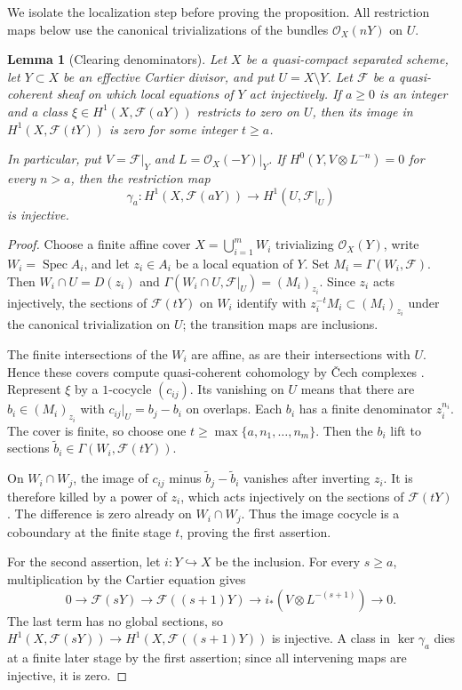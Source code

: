 \documentclass[11pt,reqno]{amsart}
\numberwithin{equation}{section}
\newtheorem{lemma}[theorem]{Lemma}
\theoremstyle{definition}
\theoremstyle{remark}
\newcommand{\OO}{\mathcal O}
\newcommand{\FF}{\mathcal F}
\newcommand{\Spec}{\operatorname{Spec}}
\begin{document}
We isolate the localization step before proving the proposition.
All restriction maps below use the canonical trivializations of the
bundles $\OO_X(nY)$ on $U$.

\begin{lemma}[Clearing denominators]\label{lem:clearing-denominators}
Let $X$ be a quasi-compact separated scheme, let $Y\subset X$ be an
effective Cartier divisor, and put $U=X\setminus Y$. Let $\FF$ be a
quasi-coherent sheaf on which local equations of $Y$ act injectively.
If $a\geq0$ is an integer and a class $\xi\in H^1(X,\FF(aY))$ restricts to zero
on $U$, then its image in $H^1(X,\FF(tY))$ is zero for some
integer $t\geq a$.

In particular, put $V=\FF|_Y$ and $L=\OO_X(-Y)|_Y$. If
$H^0(Y,V\otimes L^{-n})=0$ for every $n>a$, then the restriction map
\[
 \gamma_a:H^1(X,\FF(aY))\longrightarrow H^1(U,\FF|_U)
\]
is injective.
\end{lemma}

\begin{proof}
Choose a finite affine cover $X=\bigcup_{i=1}^m W_i$ trivializing
$\OO_X(Y)$, write $W_i=\Spec A_i$, and let $z_i\in A_i$ be a local
equation of $Y$. Set $M_i=\Gamma(W_i,\FF)$. Then
$W_i\cap U=D(z_i)$ and
$\Gamma(W_i\cap U,\FF|_U)=(M_i)_{z_i}$.
Since $z_i$ acts injectively, the sections of $\FF(tY)$ on $W_i$
identify with $z_i^{-t}M_i\subset(M_i)_{z_i}$ under the canonical
trivialization on $U$; the transition maps are inclusions.

The finite intersections of the $W_i$ are affine, as are their
intersections with $U$. Hence these covers compute quasi-coherent
cohomology by \v{C}ech complexes
\cite[Tags 0BDX and 01XD]{Stacks}.
Represent $\xi$ by a $1$-cocycle $(c_{ij})$. Its vanishing on $U$
means that there are $b_i\in(M_i)_{z_i}$ with
$c_{ij}|_U=b_j-b_i$ on overlaps. Each $b_i$ has a finite denominator
$z_i^{n_i}$. The cover is finite, so choose one
$t\geq\max\{a,n_1,\ldots,n_m\}$. Then the $b_i$ lift to sections
$\widetilde b_i\in\Gamma(W_i,\FF(tY))$.

On $W_i\cap W_j$, the image of $c_{ij}$ minus
$\widetilde b_j-\widetilde b_i$ vanishes after inverting $z_i$.
It is therefore killed by a power of $z_i$, which acts injectively
on the sections of $\FF(tY)$. The difference is zero already on
$W_i\cap W_j$. Thus the image cocycle is a coboundary at the finite
stage $t$, proving the first assertion.

For the second assertion, let $i:Y\hookrightarrow X$ be the inclusion.
For every $s\geq a$, multiplication by the Cartier equation gives
\[
 0\longrightarrow\FF(sY)\longrightarrow\FF((s+1)Y)
 \longrightarrow i_*(V\otimes L^{-(s+1)})\longrightarrow0.
\]
The last term has no global sections, so
$H^1(X,\FF(sY))\to H^1(X,\FF((s+1)Y))$ is injective.
A class in $\ker\gamma_a$ dies at a finite later stage by the first
assertion; since all intervening maps are injective, it is zero.
\end{proof}
\end{document}
